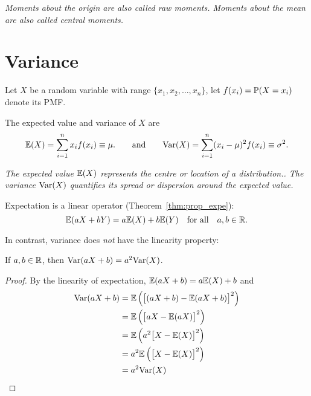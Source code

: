 \begin{remark}
\bit
\it Moments about the origin are also called \emph{raw moments}. 
\it Moments about the mean are also called \emph{central moments}. 
\eit
\end{remark}

\section{Variance}
Let $X$ be a random variable with range $\{x_1,x_2,\ldots,x_n\}$, let $f(x_i) = \mathbb{P}(X=x_i)$ denote its PMF.

The expected value and variance of $X$ are 
\[
\mathbb{E}(X) = \sum_{i=1}^{n}x_i f(x_i) \equiv \mu.
\qquad\text{and}\qquad 
\text{Var}(X) = \sum_{i=1}^{n}(x_i-\mu)^2 f(x_i) \equiv \sigma^2.
\]

\bit
\it The expected value $\mathbb{E}(X)$ represents the \emph{centre} or \emph{location} of a distribution..
\it The variance $\text{Var}(X)$ quantifies its \emph{spread} or \emph{dispersion} around the expected value.
\eit

Expectation is a linear operator (Theorem~\ref{thm:prop_expe}): 
\[
\mathbb{E}(aX+bY) = a\mathbb{E}(X) + b\mathbb{E}(Y)\quad\text{for all}\quad a,b\in\mathbb{R}.
\]

In contrast, variance does \emph{not} have the linearity property:
\begin{theorem}\label{thm:properties_of_variance}
If $a,b\in\mathbb{R}$, then $\text{Var}(aX+b) = a^2\text{Var}(X)$.
\end{theorem}
\begin{proof}
By the linearity of expectation, $\mathbb{E}(aX+b)=a\mathbb{E}(X)+b$ and
\begin{align*}
\text{Var}(aX+b)	& = \mathbb{E}\left(\big[(aX+b) - \mathbb{E}(aX+b)\big]^2\right) \\
			& = \mathbb{E}\left(\big[aX - \mathbb{E}(aX)\big]^2\right) \\
			& = \mathbb{E}\left(a^2\big[X - \mathbb{E}(X)\big]^2\right) \\
			& = a^2\mathbb{E}\left(\big[X - \mathbb{E}(X)\big]^2\right) \\
			& = a^2\text{Var}(X)
\end{align*}
\end{proof}

